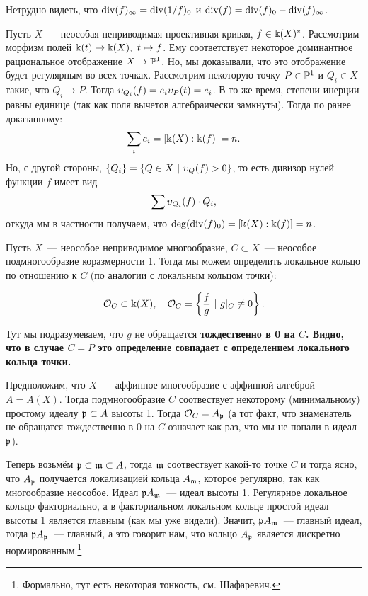 	\begin{remark}
		Нетрудно видеть, что $\operatorname{div}(f)_{\infty} = \operatorname{div}(1/f)_{0}$ и $\operatorname{div}(f) = \operatorname{div}(f)_0 - \operatorname{div}(f)_{\infty}$.
	\end{remark}

	\begin{example}
		Пусть $X$~--- неособая неприводимая проективная кривая, $f \in \Bbbk(X)^*$. Рассмотрим морфизм полей $\Bbbk(t) \to \Bbbk(X), \ t \mapsto f$. Ему соответствует некоторое доминантное рациональное отображение $X \to \mathbb{P}^1$. Но, мы доказывали, что это отображение будет регулярным во всех точках. Рассмотрим некоторую точку $P \in \mathbb{P}^1$ и $Q_i \in X$ такие, что $Q_i \mapsto P$. Тогда $\upsilon_{Q_i}(f) = e_i \upsilon_P(t) = e_i$. В то же время, степени инерции равны единице (так как поля вычетов алгебраически замкнуты). Тогда по ранее доказанному: 
		\[
			\sum_{i} e_i = [\Bbbk(X) : \Bbbk(f)] = n.
		\]
		Но, с другой стороны, $\{ Q_i \} = \{ Q \in X \ \vert \ \upsilon_Q(f) > 0 \}$, то есть дивизор нулей функции $f$ имеет вид 
		\[
			\sum \upsilon_{Q_i}(f) \cdot Q_i,
		\]
		откуда мы в частности получаем, что $\deg(\operatorname{div}(f)_0) = [\Bbbk(X) : \Bbbk(f)] = n$. 
	\end{example}

	Пусть $X$~--- неособое неприводимое многообразие, $C \subset X$~--- неособое подмногообразие коразмерности 1. Тогда мы можем определить локальное кольцо по отношению к $C$ (по аналогии с локальным кольцом точки):

	\[
		\mathcal{O}_{C} \subset \Bbbk(X), \quad \mathcal{O}_{C} = \left\{ \frac{f }{g}  \ \vert \ g\vert_{C} \not\equiv 0 \right\}. 
	\]

	Тут мы подразумеваем, что $g$ не обращается \bf{тождественно} в 0 на $C$. Видно, что в случае $C = P$ это определение совпадает с определением локального кольца точки. 

	Предположим, что $X$~--- аффинное многообразие с аффинной алгеброй $A = A(X)$. Тогда подмногообразие $C$ соотвествует некоторому (минимальному) простому идеалу $\mathfrak{p} \subset A$ высоты 1.  Тогда $\mathcal{O}_{C} = A_{\mathfrak{p}}$ (а тот факт, что знаменатель не обращатся тождественно в 0 на $C$ означает как раз, что мы не попали в идеал $\mathfrak{p}$).  

	Теперь возьмём $\mathfrak{p} \subset \mathfrak{m} \subset A$, тогда $\mathfrak{m}$ соотвествует какой-то точке $C$ и тогда ясно, что $A_{\mathfrak{p}}$ получается локализацией кольца $A_{\mathfrak{m}}$, которое регулярно, так как многообразие неособое. Идеал $\mathfrak{p} A_{\mathfrak{m}}$~--- идеал высоты 1. Регулярное локальное кольцо факториально, а в факториальном локальном кольце простой идеал высоты 1 является главным (как мы уже видели). Значит, $\mathfrak{p} A_{\mathfrak{m}}$~--- главный идеал, тогда $\mathfrak{p} A_{\mathfrak{p}}$~--- главный, а это говорит нам, что кольцо $A_{\mathfrak{p}}$ является дискретно нормированным.\footnote{Формально, тут есть некоторая тонкость, см. Шафаревич. } 


